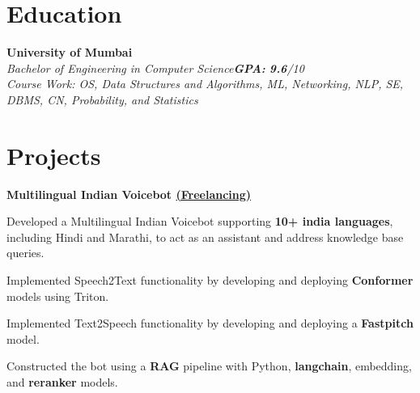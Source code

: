\documentclass[letterpaper,10pt]{article}
\newcommand{\heading}[2]{
  \hspace{10pt}#1\hfill#2\\
}
\newcommand{\headingBf}[2]{
  \heading{\textbf{#1}}{\textbf{#2}}
}
\newcommand{\headingIt}[2]{
  \heading{\textit{#1}}{\textit{#2}}
}
\newenvironment{resume_list}{
  \vspace{-7pt}
  \begin{itemize}[itemsep=-2px, parsep=1pt, leftmargin=30pt]
}{
  \end{itemize}
}
\begin{document}
  \section{Education}

  \headingBf{University of Mumbai}{} %
  \headingIt{Bachelor of Engineering in Computer Science}{\textbf{GPA:} \textbf{9.6}/10}
  \headingIt{Course Work: OS, Data Structures and Algorithms, ML, Networking, NLP, SE, DBMS, CN, Probability, and Statistics}{}



  \section{Projects}


  \headingBf{Multilingual Indian Voicebot \href{https://www.freelancer.com/u/ArunAddagatla}{(Freelancing)} }{}
  \begin{resume_list}
    \item Developed a Multilingual Indian Voicebot supporting \textbf{10+ india languages}, including Hindi and Marathi, to act as an assistant and address knowledge base queries.
    \item Implemented Speech2Text functionality by developing and deploying \textbf{Conformer} models using Triton.
    \item Implemented Text2Speech functionality by developing and deploying a \textbf{Fastpitch} model.
    \item Constructed the bot using a \textbf{RAG} pipeline with Python, \textbf{langchain}, embedding, and \textbf{reranker} models.
  \end{resume_list}
\end{document}
